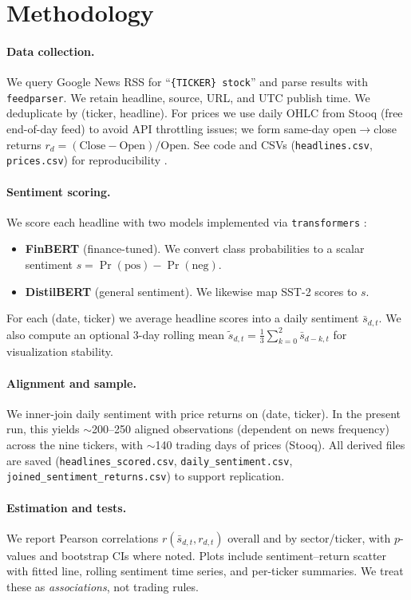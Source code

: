 \section{Methodology}

\paragraph{Data collection.}
We query Google News RSS for “\texttt{\{TICKER\} stock}” and parse results with \texttt{feedparser}. We retain headline, source, URL, and UTC publish time. We deduplicate by (ticker, headline). For prices we use daily OHLC from Stooq (free end-of-day feed) to avoid API throttling issues; we form same-day open$\to$close returns $r_{d}=(\mathrm{Close}-\mathrm{Open})/\mathrm{Open}$. See code and CSVs (\texttt{headlines.csv}, \texttt{prices.csv}) for reproducibility \citep{feedparser,stooq}.

\paragraph{Sentiment scoring.}
We score each headline with two models implemented via \texttt{transformers} \citep{wolf2020transformers}:
\begin{itemize}
  \item \textbf{FinBERT} \citep{araci2019finbert,prosusfinbert} (finance-tuned). We convert class probabilities to a scalar sentiment $s=\Pr(\text{pos})-\Pr(\text{neg})$.
  \item \textbf{DistilBERT} \citep{sanh2019distilbert,sst2} (general sentiment). We likewise map SST-2 scores to $s$.
\end{itemize}
For each (date, ticker) we average headline scores into a daily sentiment $\bar{s}_{d,t}$. We also compute an optional $3$-day rolling mean $\tilde{s}_{d,t}=\frac{1}{3}\sum_{k=0}^{2}\bar{s}_{d-k,t}$ for visualization stability.

\paragraph{Alignment and sample.}
We inner-join daily sentiment with price returns on (date, ticker). In the present run, this yields $\sim$200--250 aligned observations (dependent on news frequency) across the nine tickers, with $\sim$140 trading days of prices (Stooq). All derived files are saved (\texttt{headlines\_scored.csv}, \texttt{daily\_sentiment.csv}, \texttt{joined\_sentiment\_returns.csv}) to support replication.

\paragraph{Estimation and tests.}
We report Pearson correlations $r(\bar{s}_{d,t}, r_{d,t})$ overall and by sector/ticker, with $p$-values and bootstrap CIs where noted. Plots include sentiment–return scatter with fitted line, rolling sentiment time series, and per-ticker summaries. We treat these as \emph{associations}, not trading rules.
